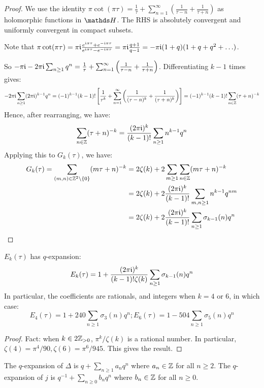 \documentclass[10pt,a4paper]{article}
\begin{document}
\begin{proof}
  We use the identity $\pi\cot(\pi\tau) = \frac{1}{\tau} + \sum_{n=1}^\infty \left(\frac{1}{\tau-n} + \frac{1}{\tau+n}\right)$ as holomorphic functions in $\H$. The RHS is absolutely convergent and uniformly convergent in compact subsets.

  Note that $\pi\cot(\pi\tau) = \pi\mathfrak{i} \frac{e^{\mathfrak{i}\pi\tau}+e^{-\mathfrak{i}\pi\tau}}{e^{\mathfrak{i}\pi\tau}-e^{-\mathfrak{i}\pi\tau}} = \pi\mathfrak{i}\frac{q+1}{q-1} = -\pi\mathfrak{i}(1+q)(1+q+q^2+\ldots)$.

  So $-\pi\mathfrak{i}-2\pi\mathfrak{i}\sum_{n\geq 1}q^n = \frac{1}{\tau}+\sum_{n=1}^\infty \left(\frac{1}{\tau-n}+\frac{1}{\tau+n}\right)$. Differentiating $k-1$ times gives:
  \[-2\pi\mathfrak{i}\sum_{n\geq 1}(2\pi\mathfrak{i})^{k-1}q^n = (-1)^{k-1}(k-1)! \left[\frac{1}{\tau^k}+\sum_{n=1}^\infty\left(\frac{1}{(\tau-n)^k} + \frac{1}{(\tau+n)^k}\right)\right] = (-1)^{k-1}(k-1)!\sum_{n\in\mathbb{Z}}(\tau+n)^{-k}\]
  Hence, after rearranging, we have:
  \[\sum_{n\in\mathbb{Z}}(\tau+n)^{-k} = \frac{(2\pi\mathfrak{i})^k}{(k-1)!}\sum_{n\geq 1}n^{k-1}q^n\]
  Applying this to $G_k(\tau)$, we have:
  \begin{align*}
    G_k(\tau) = \sum_{(m,n)\in \mathbb{Z}^2\setminus\{0\}}(m\tau+n)^{-k} &= 2\zeta(k) + 2\sum_{m\geq 1}\sum_{n\in\mathbb{Z}}(m\tau+n)^{-k}\\
    &= 2\zeta(k) + 2\frac{(2\pi\mathfrak{i})^k}{(k-1)!}\sum_{m,n\geq 1}n^{k-1}q^{nm}\\
    &=2 \zeta(k) + 2\frac{(2\pi\mathfrak{i})^k}{(k-1)!}\sum_{n\geq 1}\sigma_{k-1}(n)q^n
  \end{align*}
\end{proof}
\begin{corollary}
  $E_k(\tau)$ has $q$-expansion:
  \[E_k(\tau) = 1+\frac{(2\pi\mathfrak{i})^k}{(k-1)!\zeta(k)} \sum_{n\geq 1}\sigma_{k-1}(n)q^n\]
  In particular, the coefficients are rationals, and integers when $k=4$ or $6$, in which case:
  \[E_4(\tau) = 1 + 240\sum_{n\geq 1}\sigma_3(n)q^n; E_6(\tau) = 1-504\sum_{n\geq 1}\sigma_5(n)q^n\]
\end{corollary}
\begin{proof}
  Fact: when $k \in 2\mathbb{Z}_{>0}$, $\pi^k/\zeta(k)$ is a rational number. In particular, $\zeta(4) = \pi^4/90, \zeta(6) = \pi^6/945$. This gives the result.
\end{proof}
\begin{proposition}
  The $q$-expansion of $\Delta$ is $q + \sum_{n\geq 1}a_nq^n$ where $a_n \in \mathbb{Z}$ for all $n \geq 2$. The $q$-expansion of $j$ is $q^{-1} + \sum_{n\geq 0}b_nq^n$ where $b_n \in \mathbb{Z}$ for all $n\geq 0$.
\end{proposition}
\end{document}
